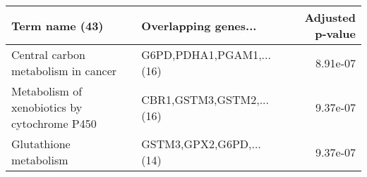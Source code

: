 \begin{tabular}{llr}
\toprule
                              Term name (43) &     Overlapping genes... &  Adjusted p-value \\
\midrule
         Central carbon metabolism in cancer & G6PD,PDHA1,PGAM1,...(16) &          8.91e-07 \\
Metabolism of xenobiotics by cytochrome P450 & CBR1,GSTM3,GSTM2,...(16) &          9.37e-07 \\
                      Glutathione metabolism &  GSTM3,GPX2,G6PD,...(14) &          9.37e-07 \\
\bottomrule
\end{tabular}
